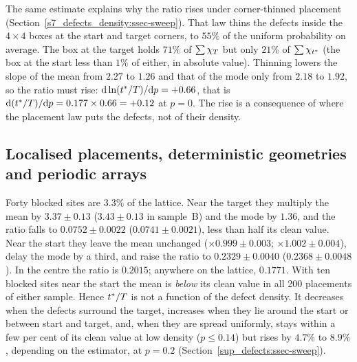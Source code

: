 The same estimate explains why the ratio rises under corner-thinned placement
(Section~\ref{s7_defects_density:ssec-sweep}). That law thins the defects inside the $4\times4$ boxes at the start
and target corners, to $55\%$ of the uniform probability on average. The box at the target holds $71\%$ of
$\sum\chi_{T}$ but only $21\%$ of $\sum\chi_{t^{*}}$ (the box at the start less than $1\%$ of either, in absolute value).
Thinning lowers the slope of the mean from $2.27$ to $1.26$ and that of the mode only from $2.18$ to $1.92$, so
the ratio must rise: $\mathrm{d}\ln(t^{*}/T)/\mathrm{d} p=+0.66$, that is $\mathrm{d}(t^{*}/T)/\mathrm{d} p=0.177\times0.66=+0.12$ at
$p=0$.
The rise is a consequence of where the placement law puts the defects, not of their density.

\subsection{Localised placements, deterministic geometries and periodic arrays}\label{s8_defects_placement:ssec-det}

Forty blocked sites are $3.3\%$ of the lattice. Near the target they multiply the mean by $3.37\pm0.13$
($3.43\pm0.13$ in sample~B) and the mode by $1.36$, and the ratio falls to $0.0752\pm0.0022$
($0.0741\pm0.0021$), less than half its clean value. Near the start they leave the mean unchanged
($\times0.999\pm0.003$; $\times1.002\pm0.004$), delay the mode by a third, and raise the ratio to
$0.2329\pm0.0040$ ($0.2368\pm0.0048$). In the centre the ratio is $0.2015$; anywhere on the lattice, $0.1771$.
With ten blocked sites near the start the mean is \emph{below} its clean value in all 200 placements of either
sample.
Hence $t^{*}/T$ is not a function of the defect density. It decreases when the defects surround the target,
increases when they lie around the start or between start and target, and, when they are spread uniformly, stays within
a few per cent of its clean value at low density ($p\le0.14$) but rises by $4.7\%$ to $8.9\%$, depending on the
estimator, at $p=0.2$ (Section~\ref{sup_defects:ssec-sweep}).

